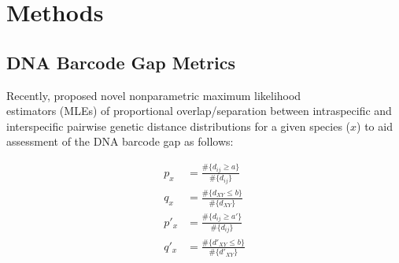 \documentclass[12pt]{article}
\begin{document}
\section{Methods}

\subsection{DNA Barcode Gap Metrics}

Recently, \citet{phillips2024measure} proposed novel nonparametric maximum likelihood \\ estimators (MLEs) of proportional overlap/separation between intraspecific and interspecific pairwise genetic distance distributions for a given species ($x$) to aid assessment of the DNA barcode gap as follows:

\begin{align}
p_x &= \frac{\#\{d_{ij} \geq a\}}{\#\{d_{ij}\}} \\[1mm]
q_x &= \frac{\#\{d_{XY} \leq b\}}{\#\{d_{XY}\}} \\[1mm]
p'_x &= \frac{\#\{d_{ij} \geq a'\}}{\#\{d_{ij}\}} \\[1mm]
q'_x &= \frac{\#\{d'_{XY} \leq b\}}{\#\{d'_{XY}\}}
\end{align}
\end{document}
